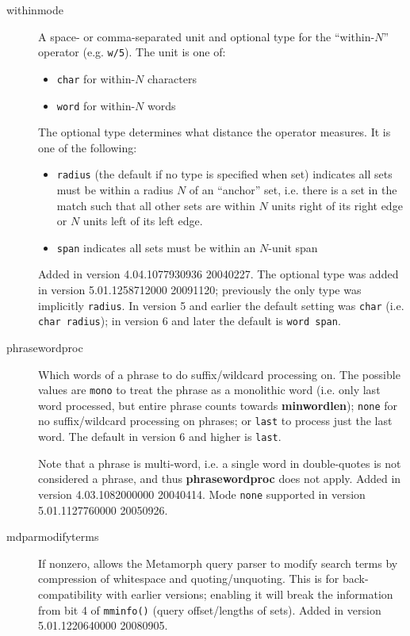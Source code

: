 \begin{description}
\item[withinmode]
    A space- or comma-separated unit and optional type for the
    ``within-$N$'' operator (e.g. \verb`w/5`).  The unit is one of:
    \begin{itemize}
      \item \verb`char` for within-$N$ characters
      \item \verb`word` for within-$N$ words
    \end{itemize}
    The optional type determines what distance the operator measures.
    It is one of the following:
    \begin{itemize}
      \item \verb`radius` (the default if no type is specified when
        set) indicates all sets must be within a radius $N$ of an
        ``anchor'' set, i.e. there is a set in the match such that all
        other sets are within $N$ units right of its right edge or $N$
        units left of its left edge.
      \item \verb`span` indicates all sets must be within an $N$-unit
        span
    \end{itemize}
    Added in version 4.04.1077930936 20040227.  The optional type was
    added in version 5.01.1258712000 20091120; previously the only
    type was implicitly \verb`radius`.  In version 5 and earlier the
    default setting was \verb`char` (i.e. {\tt char radius}); in
    version 6 and later the default is {\tt word span}.

\item[phrasewordproc]
    Which words of a phrase to do suffix/wildcard processing on.  The
    possible values are \verb`mono` to treat the phrase as a
    monolithic word (i.e. only last word processed, but entire phrase
    counts towards {\bf minwordlen}); \verb`none` for no
    suffix/wildcard processing on phrases; or \verb`last` to process just
    the last word.  The default in version 6 and higher is \verb`last`.

%
    Note that a phrase is multi-word, i.e. a single word in double-quotes
    is not considered a phrase, and thus {\bf phrasewordproc} does not apply.
    Added in version 4.03.1082000000 20040414.  Mode \verb`none`
    supported in version 5.01.1127760000 20050926.

\item[mdparmodifyterms]
  If nonzero, allows the Metamorph query parser to modify search terms
by compression of whitespace and quoting/unquoting.  This is for
back-compatibility with earlier versions; enabling it will break the
information from bit 4 of \verb`mminfo()` (query offset/lengths of
sets).  Added in version 5.01.1220640000 20080905.

\end{description}

